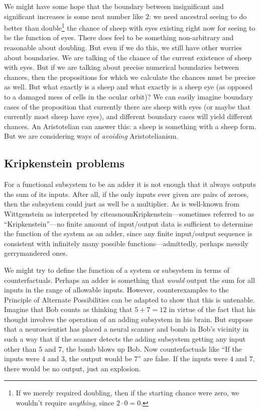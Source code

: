We might have some hope that the boundary between insignificant and significant increases is some neat number like $2$: we 
need ancestral seeing to do better than double\footnote{If we merely required doubling, then if the starting chance were 
zero, we wouldn't require \textit{anything}, since $2\cdot 0=0$.} the chance of sheep with eyes existing right now for 
seeing to be the function of eyes. There does feel to be something non-arbitrary and reasonable about doubling. But even 
if we do this, we still have other worries about boundaries. We are talking of the chance of the current existence of sheep 
with eyes. But if we are talking about precise numerical boundaries between chances, then the propositions for which we 
calculate the chances must be precise as well. But what exactly is a sheep and what exactly is a sheep eye (as opposed to 
a damaged mess of cells in the ocular orbit)? We can easily 
imagine boundary cases of the proposition that currently there are sheep with eyes (or maybe that currently most sheep have
eyes), and different boundary cases will yield different chances. An Aristotelian can answer this: a sheep is something
with a sheep form. But we are considering ways of \textit{avoiding} Aristotelianism.

\subsection{Kripkenstein problems}
For a functional subsystem to be an adder it is not enough that it always outputs the sum of its inputs. 
After all, if the only inputs ever
given are pairs of zeroes, then the subsystem could just as well be a multiplier. As is well-known from Wittgenstein as interpreted by citeasnoun{Kripkenstein}---sometimes referred to as ``Kripkenstein''---no finite amount of 
input/output data is sufficient to determine the function of the system as an adder, since any 
finite input/output sequence is consistent with infinitely many possible functions---admittedly, perhaps messily gerrymandered ones.

We might try to define the function of a system or subsystem in terms of counterfactuals. Perhaps an adder is something that \textit{would}
output the sum for all inputs in the range of allowable inputs. However,  counterexamples to the Principle of Alternate
Possibilities can be adapted to show that this is untenable. Imagine that Bob counts as thinking that $5+7=12$ in virtue of the 
fact that his thought involves the operation of an adding subsystem in his brain. But suppose that a neuroscientist has placed a neural
scanner and bomb in Bob's vicinity in such a way that if the scanner detects the adding subsystem getting any input other than 
$5$ and $7$, the bomb blows up Bob. Now counterfactuals like ``If the inputs were $4$ and $3$, the output would be $7$'' are false.
If the inputs were $4$ and $7$, there would be no output, just an explosion.

